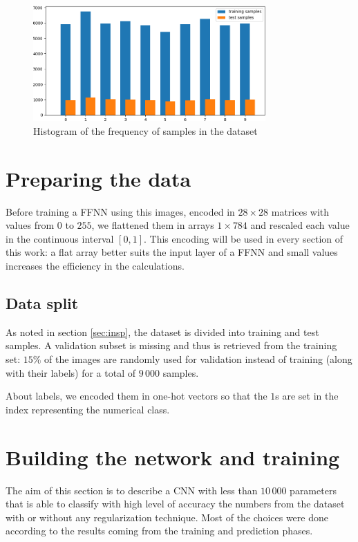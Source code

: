 \documentclass[compsoc]{IEEEtran}
\begin{document}
\begin{figure}[ht!]
\centering                                                                        
\includegraphics[width=3.5in]{hist.png}
\captionsetup{justification=centering}                                                                                         
\caption{Histogram of the frequency of samples in the dataset}
\label{fig:hist}                                                                                                                               
\end{figure}

\section{Preparing the data}
Before training a FFNN using this images, encoded in $28\times28$ matrices with values from $0$ to $255$, we flattened them in
arrays $1\times784$ and rescaled each value in the continuous interval $[0, 1]$. This encoding will be used in every section of this work: a flat array
better suits the input layer of a FFNN and small values increases the efficiency in the calculations.


\subsection{Data split}
As noted in section \ref{sec:insp}, the dataset is divided into training and test samples. A validation subset is missing and thus
is retrieved from the training set: $15\%$ of the images are randomly used for validation instead of training (along with their labels) for a total of $9\,000$ samples. \par
About labels, we encoded them in one-hot vectors so that the $1$s are set in the index representing the numerical class. \par

\section{Building the network and training}
The aim of this section is to describe a CNN with less than $10\,000$ parameters that is able to classify
with high level of accuracy the numbers from the dataset with or without any regularization technique. Most of the choices were done according to the results
coming from the training and prediction phases.
\end{document}
